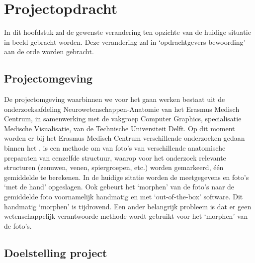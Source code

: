 \section{Projectopdracht}
\label{projectopdracht}


In dit hoofdstuk zal de gewenste verandering ten opzichte van de huidige situatie in beeld gebracht worden. 
Deze verandering zal in `opdrachtgevers bewoording' aan de orde worden gebracht. 


\subsection{Projectomgeving}

De projectomgeving waarbinnen we voor het \casamproject gaan werken bestaat uit de onderzoeksafdeling Neurowetenschappen-Anatomie van het Erasmus Medisch Centrum, in samenwerking met de vakgroep Computer Graphics, specialisatie Medische Visualisatie, van de Technische Universiteit Delft. 
Op dit moment worden er bij het Erasmus Medisch Centrum verschillende onderzoeken gedaan binnen het \casamproject. 
\casam is een methode om van foto's van verschillende anatomische preparaten van eenzelfde structuur, waarop voor het onderzoek relevante structuren (zenuwen, venen, spiergroepen, etc.) worden gemarkeerd, \'e\'en gemiddelde te berekenen. 
In de huidige sitatie worden de meetgegevens en foto's `met de hand' opgeslagen. 
Ook gebeurt het `morphen' van de foto's naar de gemiddelde foto voornamelijk handmatig en met `out-of-the-box' software. 
Dit handmatig `morphen' is tijdrovend. 
Een ander belangrijk probleem is dat er geen wetenschappelijk verantwoorde methode wordt gebruikt voor het `morphen' van de foto's.


\subsection{Doelstelling project}

